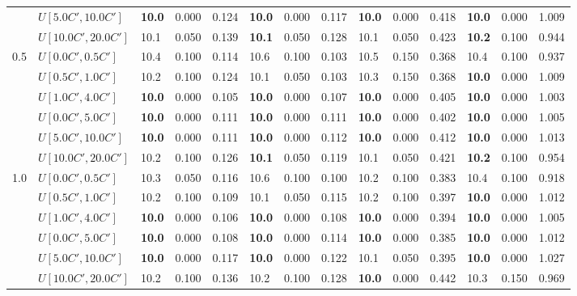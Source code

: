 \begin{table}[h]
{\begin{tabular}{|l|l||l|l|l||l|l|l||l|l|l||l|l|l|}
       & $U[5.0C',10.0C']$ & \textbf{10.0} & 0.000 & 0.124 & \textbf{10.0} & 0.000 & 0.117 & \textbf{10.0} & 0.000 & 0.418 & \textbf{10.0} & 0.000 & 1.009 \\
       & $U[10.0C',20.0C']$ & 10.1 & 0.050 & 0.139 & \textbf{10.1} & 0.050 & 0.128 & 10.1 & 0.050 & 0.423 & \textbf{10.2} & 0.100 & 0.944 \\
      \hline\hline
      \multirow{6}{*}{0.5} & $U[0.0C',0.5C']$ & 10.4 & 0.100 & 0.114 & 10.6 & 0.100 & 0.103 & 10.5 & 0.150 & 0.368 & 10.4 & 0.100 & 0.937 \\
       & $U[0.5C',1.0C']$ & 10.2 & 0.100 & 0.124 & 10.1 & 0.050 & 0.103 & 10.3 & 0.150 & 0.368 & \textbf{10.0} & 0.000 & 1.009 \\
       & $U[1.0C',4.0C']$ & \textbf{10.0} & 0.000 & 0.105 & \textbf{10.0} & 0.000 & 0.107 & \textbf{10.0} & 0.000 & 0.405 & \textbf{10.0} & 0.000 & 1.003 \\
       & $U[0.0C',5.0C']$ & \textbf{10.0} & 0.000 & 0.111 & \textbf{10.0} & 0.000 & 0.111 & \textbf{10.0} & 0.000 & 0.402 & \textbf{10.0} & 0.000 & 1.005 \\
       & $U[5.0C',10.0C']$ & \textbf{10.0} & 0.000 & 0.111 & \textbf{10.0} & 0.000 & 0.112 & \textbf{10.0} & 0.000 & 0.412 & \textbf{10.0} & 0.000 & 1.013 \\
       & $U[10.0C',20.0C']$ & 10.2 & 0.100 & 0.126 & \textbf{10.1} & 0.050 & 0.119 & 10.1 & 0.050 & 0.421 & \textbf{10.2} & 0.100 & 0.954 \\
      \hline\hline
      \multirow{6}{*}{1.0} & $U[0.0C',0.5C']$ & 10.3 & 0.050 & 0.116 & 10.6 & 0.100 & 0.100 & 10.2 & 0.100 & 0.383 & 10.4 & 0.100 & 0.918 \\
       & $U[0.5C',1.0C']$ & 10.2 & 0.100 & 0.109 & 10.1 & 0.050 & 0.115 & 10.2 & 0.100 & 0.397 & \textbf{10.0} & 0.000 & 1.012 \\
       & $U[1.0C',4.0C']$ & \textbf{10.0} & 0.000 & 0.106 & \textbf{10.0} & 0.000 & 0.108 & \textbf{10.0} & 0.000 & 0.394 & \textbf{10.0} & 0.000 & 1.005 \\
       & $U[0.0C',5.0C']$ & \textbf{10.0} & 0.000 & 0.108 & \textbf{10.0} & 0.000 & 0.114 & \textbf{10.0} & 0.000 & 0.385 & \textbf{10.0} & 0.000 & 1.012 \\
       & $U[5.0C',10.0C']$ & \textbf{10.0} & 0.000 & 0.117 & \textbf{10.0} & 0.000 & 0.122 & 10.1 & 0.050 & 0.395 & \textbf{10.0} & 0.000 & 1.027 \\
       & $U[10.0C',20.0C']$ & 10.2 & 0.100 & 0.136 & 10.2 & 0.100 & 0.128 & \textbf{10.0} & 0.000 & 0.442 & 10.3 & 0.150 & 0.969 \\

\end{tabular}}
\end{table}
